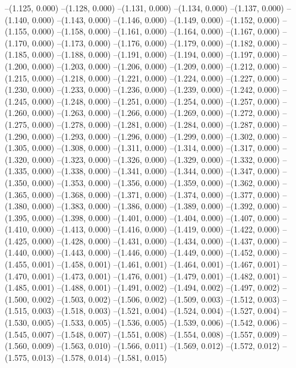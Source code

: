 --(1.125, 0.000)
--(1.128, 0.000)
--(1.131, 0.000)
--(1.134, 0.000)
--(1.137, 0.000)
--(1.140, 0.000)
--(1.143, 0.000)
--(1.146, 0.000)
--(1.149, 0.000)
--(1.152, 0.000)
--(1.155, 0.000)
--(1.158, 0.000)
--(1.161, 0.000)
--(1.164, 0.000)
--(1.167, 0.000)
--(1.170, 0.000)
--(1.173, 0.000)
--(1.176, 0.000)
--(1.179, 0.000)
--(1.182, 0.000)
--(1.185, 0.000)
--(1.188, 0.000)
--(1.191, 0.000)
--(1.194, 0.000)
--(1.197, 0.000)
--(1.200, 0.000)
--(1.203, 0.000)
--(1.206, 0.000)
--(1.209, 0.000)
--(1.212, 0.000)
--(1.215, 0.000)
--(1.218, 0.000)
--(1.221, 0.000)
--(1.224, 0.000)
--(1.227, 0.000)
--(1.230, 0.000)
--(1.233, 0.000)
--(1.236, 0.000)
--(1.239, 0.000)
--(1.242, 0.000)
--(1.245, 0.000)
--(1.248, 0.000)
--(1.251, 0.000)
--(1.254, 0.000)
--(1.257, 0.000)
--(1.260, 0.000)
--(1.263, 0.000)
--(1.266, 0.000)
--(1.269, 0.000)
--(1.272, 0.000)
--(1.275, 0.000)
--(1.278, 0.000)
--(1.281, 0.000)
--(1.284, 0.000)
--(1.287, 0.000)
--(1.290, 0.000)
--(1.293, 0.000)
--(1.296, 0.000)
--(1.299, 0.000)
--(1.302, 0.000)
--(1.305, 0.000)
--(1.308, 0.000)
--(1.311, 0.000)
--(1.314, 0.000)
--(1.317, 0.000)
--(1.320, 0.000)
--(1.323, 0.000)
--(1.326, 0.000)
--(1.329, 0.000)
--(1.332, 0.000)
--(1.335, 0.000)
--(1.338, 0.000)
--(1.341, 0.000)
--(1.344, 0.000)
--(1.347, 0.000)
--(1.350, 0.000)
--(1.353, 0.000)
--(1.356, 0.000)
--(1.359, 0.000)
--(1.362, 0.000)
--(1.365, 0.000)
--(1.368, 0.000)
--(1.371, 0.000)
--(1.374, 0.000)
--(1.377, 0.000)
--(1.380, 0.000)
--(1.383, 0.000)
--(1.386, 0.000)
--(1.389, 0.000)
--(1.392, 0.000)
--(1.395, 0.000)
--(1.398, 0.000)
--(1.401, 0.000)
--(1.404, 0.000)
--(1.407, 0.000)
--(1.410, 0.000)
--(1.413, 0.000)
--(1.416, 0.000)
--(1.419, 0.000)
--(1.422, 0.000)
--(1.425, 0.000)
--(1.428, 0.000)
--(1.431, 0.000)
--(1.434, 0.000)
--(1.437, 0.000)
--(1.440, 0.000)
--(1.443, 0.000)
--(1.446, 0.000)
--(1.449, 0.000)
--(1.452, 0.000)
--(1.455, 0.001)
--(1.458, 0.001)
--(1.461, 0.001)
--(1.464, 0.001)
--(1.467, 0.001)
--(1.470, 0.001)
--(1.473, 0.001)
--(1.476, 0.001)
--(1.479, 0.001)
--(1.482, 0.001)
--(1.485, 0.001)
--(1.488, 0.001)
--(1.491, 0.002)
--(1.494, 0.002)
--(1.497, 0.002)
--(1.500, 0.002)
--(1.503, 0.002)
--(1.506, 0.002)
--(1.509, 0.003)
--(1.512, 0.003)
--(1.515, 0.003)
--(1.518, 0.003)
--(1.521, 0.004)
--(1.524, 0.004)
--(1.527, 0.004)
--(1.530, 0.005)
--(1.533, 0.005)
--(1.536, 0.005)
--(1.539, 0.006)
--(1.542, 0.006)
--(1.545, 0.007)
--(1.548, 0.007)
--(1.551, 0.008)
--(1.554, 0.008)
--(1.557, 0.009)
--(1.560, 0.009)
--(1.563, 0.010)
--(1.566, 0.011)
--(1.569, 0.012)
--(1.572, 0.012)
--(1.575, 0.013)
--(1.578, 0.014)
--(1.581, 0.015)
